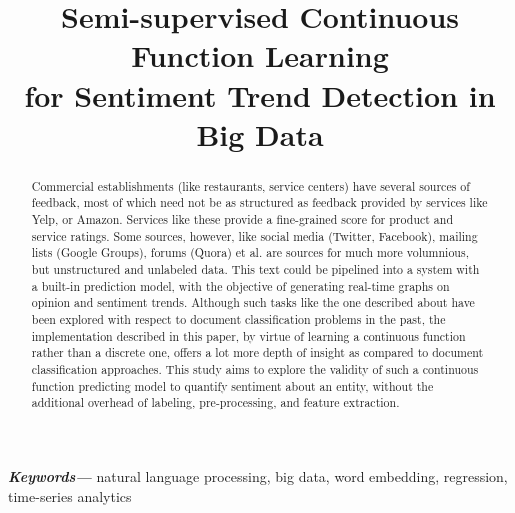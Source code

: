 \documentclass[conference]{IEEEtran}
\begin{document}
\title{Semi-supervised Continuous Function Learning\\ for Sentiment Trend Detection in Big Data}


\author{
}

\maketitle

\begin{abstract}
Commercial establishments (like restaurants, service centers) have several sources of feedback, most of which need not be as structured as feedback provided by services like Yelp, or Amazon. Services like these provide a fine-grained score for product and service ratings. Some sources, however, like social media (Twitter, Facebook), mailing lists (Google Groups), forums (Quora) et al. are sources for much more volumnious, but unstructured and unlabeled data. This text could be pipelined into a system with a built-in prediction model, with the objective of generating real-time graphs on opinion and sentiment trends. Although such tasks like the one described about have been explored with respect to document classification problems in the past, the implementation described in this paper, by virtue of learning a continuous function rather than a discrete one, offers a lot more depth of insight as compared to document classification approaches. This study aims to explore the validity of such a continuous function predicting model to quantify sentiment about an entity, without the additional overhead of labeling, pre-processing, and feature extraction.
\end{abstract}


\providecommand{\keywords}[1]{\textbf{\textit{Keywords---}} #1}
\keywords{natural language processing, big data, word embedding, regression, time-series analytics}

\IEEEpeerreviewmaketitle
\end{document}
